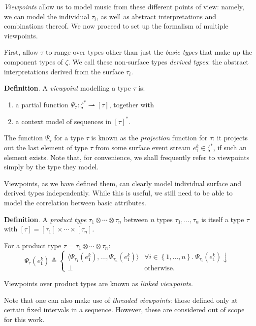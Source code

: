 \documentclass[12pt,a4paper,twoside,openright]{report}
\newcommand{\set}[1]{ \left\{ #1 \right\} }
\begin{document}
\emph{Viewpoints} allow us to model music from these different points of view:
namely, we can model the individual $\tau_i$, as well as abstract
interpretations and combinations thereof. We now proceed to set up the formalism
of multiple viewpoints.

First, allow $\tau$ to range over types other than just the \emph{basic types}
that make up the component types of $\zeta$. We call these non-surface types
\emph{derived types}: the abstract interpretations derived from the surface
$\tau_i$. 

\textbf{Definition}. A \emph{viewpoint} modelling a type $\tau$ is:
\begin{enumerate}[label=\arabic*., itemsep=0mm]
  \item a partial function $\Psi_\tau : \zeta^* \rightharpoonup [\tau]$,
    together with
  \item a context model of sequences in $[\tau]^*$.
\end{enumerate}

The function $\Psi_\tau$ for a type $\tau$ is known as the \emph{projection}
function for $\tau$: it projects out the last element of type $\tau$ from some
surface event stream $e_1^k \in \zeta^*$, if such an element exists. Note that,
for convenience, we shall frequently refer to viewpoints simply by the type they
model. 

Viewpoints, as we have defined them, can clearly model individual surface and
derived types independently. While this is useful, we still need to be able to
model the correlation between basic attributes.

\textbf{Definition}. A \emph{product type} $\tau_1 \otimes \cdots \otimes
\tau_n$ between $n$ types $\tau_1, \ldots, \tau_n$ is itself a type $\tau$ with
$[\tau] = [\tau_1] \times \cdots \times [\tau_n]$. 

For a product type $\tau = \tau_1 \otimes \cdots \otimes \tau_n$:
$$ \Psi_\tau(e_1^k) \triangleq
\begin{cases}
  \langle\Psi_{\tau_1}(e_1^k), \ldots, \Psi_{\tau_n}(e_1^k)\rangle & \forall i
  \in \set{1,\ldots,n}.\
  \Psi_{\tau_i}(e_1^k)\downarrow \\
  \bot & \text{otherwise.}
\end{cases}
$$

Viewpoints over product types are known as \emph{linked viewpoints}. 

Note that one can also make use of \emph{threaded viewpoints}: those defined
only at certain fixed intervals in a sequence. However, these are considered out
of scope for this work.
\end{document}
